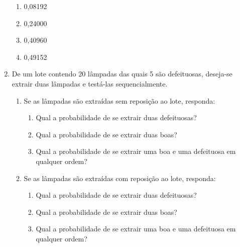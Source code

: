 \begin{enumerate}
\begin{enumerate}
\item {} 
0,08192

\item {} 
0,24000

\item {} 
0,40960

\item {} 
0,49152

\end{enumerate}

\item De um lote contendo 20 lâmpadas das quais 5 são defeituosas, deseja-se extrair duas lâmpadas e testá-las sequencialmente.
\begin{enumerate}
\item {} 
Se as lâmpadas são extraídas sem reposição ao lote, responda:
\begin{enumerate}[label=\roman*)]
\item {} 
Qual a probabilidade de se extrair duas defeituosas?

\item {} 
Qual a probabilidade de se extrair duas boas?

\item {} 
Qual a probabilidade de se extrair uma boa e uma defeituosa em qualquer ordem?

\end{enumerate}

\item {} 
Se as lâmpadas são extraídas com reposição ao lote, responda:

\begin{enumerate}[label=\roman*)]
\item {} 
Qual a probabilidade de se extrair duas defeituosas?

\item {} 
Qual a probabilidade de se extrair duas boas?

\item {} 
Qual a probabilidade de se extrair uma boa e uma defeituosa em qualquer ordem?

\end{enumerate}
\end{enumerate}
\end{enumerate}



